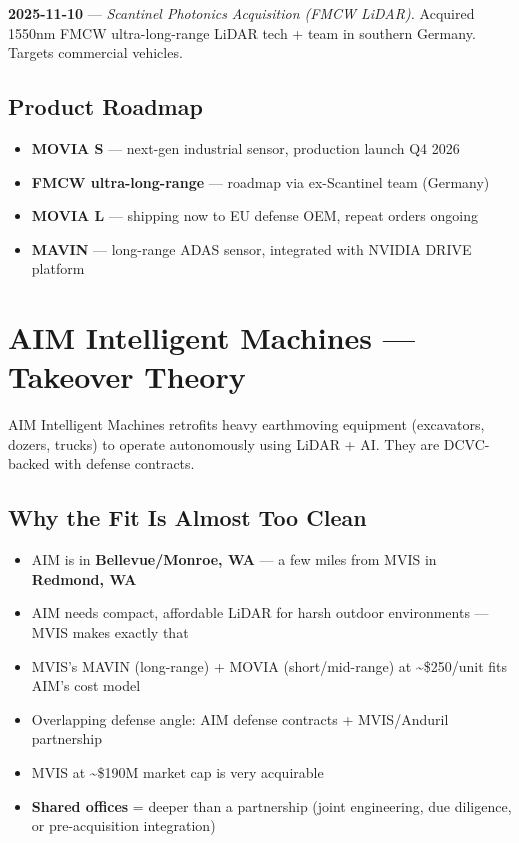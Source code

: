 \documentclass[11pt,letterpaper]{article}
\begin{document}
{\color{datecyan}\textbf{2025-11-10}} --- \textit{Scantinel Photonics Acquisition (FMCW LiDAR).}
Acquired 1550nm FMCW ultra-long-range LiDAR tech + team in southern Germany. Targets commercial vehicles.

\subsection{Product Roadmap}

\begin{itemize}
\item \textbf{MOVIA S} --- next-gen industrial sensor, production launch Q4 2026
\item \textbf{FMCW ultra-long-range} --- roadmap via ex-Scantinel team (Germany)
\item \textbf{MOVIA L} --- shipping now to EU defense OEM, repeat orders ongoing
\item \textbf{MAVIN} --- long-range ADAS sensor, integrated with NVIDIA DRIVE platform
\end{itemize}

\section{AIM Intelligent Machines --- Takeover Theory}


AIM Intelligent Machines retrofits heavy earthmoving equipment (excavators, dozers, trucks) to operate autonomously using LiDAR + AI. They are DCVC-backed with defense contracts.

\subsection{Why the Fit Is Almost Too Clean}

\begin{itemize}
\item AIM is in \textbf{Bellevue/Monroe, WA} --- a few miles from MVIS in \textbf{Redmond, WA}
\item AIM needs compact, affordable LiDAR for harsh outdoor environments --- MVIS makes exactly that
\item MVIS's MAVIN (long-range) + MOVIA (short/mid-range) at \textasciitilde\$250/unit fits AIM's cost model
\item Overlapping defense angle: AIM defense contracts + MVIS/Anduril partnership
\item MVIS at \textasciitilde\$190M market cap is very acquirable
\item \textbf{Shared offices} = deeper than a partnership (joint engineering, due diligence, or pre-acquisition integration)
\end{itemize}
\end{document}
